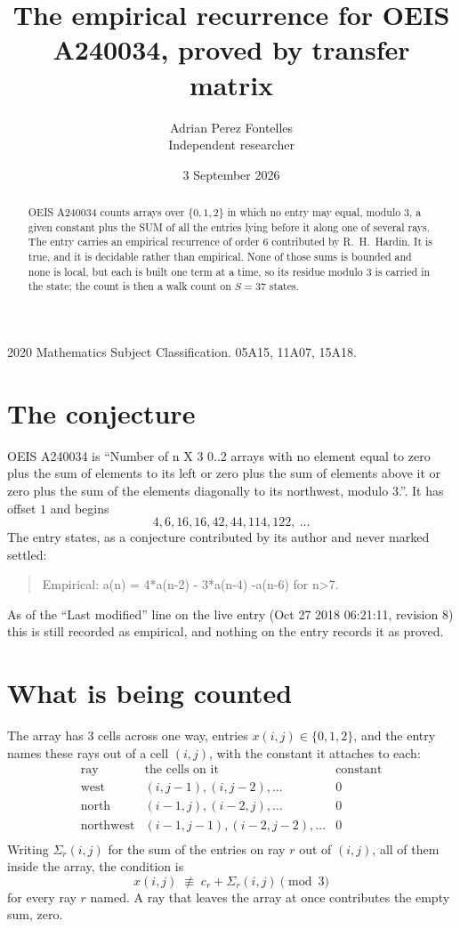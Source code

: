 \documentclass[11pt,a4paper]{article}
\title{The empirical recurrence for OEIS A240034, proved by transfer matrix}
\author{Adrian Perez Fontelles\\ \small Independent researcher}
\date{3 September 2026}
\theoremstyle{plain}
\theoremstyle{definition}
\begin{document}
\maketitle

\begin{abstract}
OEIS A240034 counts arrays over $\{0,1,2\}$ in which no entry may equal, modulo $3$, a given
constant plus the SUM of all the entries lying before it along one of several rays. The entry
carries an empirical recurrence of order $6$ contributed by R.~H.~Hardin. It is true, and
it is decidable rather than empirical. None of those sums is bounded and none is local, but
each is built one term at a time, so its residue modulo $3$ is carried in the state; the
count is then a walk count on $S=37$ states.
\end{abstract}

\noindent\small 2020 Mathematics Subject Classification. 05A15, 11A07, 15A18.\normalsize

\section{The conjecture}

OEIS A240034 is ``Number of n X 3 0..2 arrays with no element equal to zero plus the sum of elements to its left or zero plus the sum of elements above it or zero plus the sum of the elements diagonally to its northwest, modulo 3.''. It has offset $1$ and begins
\[
4, 6, 16, 16, 42, 44, 114, 122,\ \dots
\]
The entry states, as a conjecture contributed by its author and never marked settled:
\begin{quote}
Empirical: a(n) = 4*a(n-2) - 3*a(n-4)  -a(n-6) for n>7.
\end{quote}
As of the ``Last modified'' line on the live entry (Oct 27 2018 06:21:11, revision 8) this is still
recorded as empirical, and nothing on the entry records it as proved.

\section{What is being counted}

The array has $3$ cells across one way, entries $x(i,j)\in\{0,1,2\}$, and the entry names these
rays out of a cell $(i,j)$, with the constant it attaches to each:
\[
\begin{array}{lll}
\text{ray} & \text{the cells on it} & \text{constant} \\[2pt]
\text{west} & (i,j-1),(i,j-2),\dots & 0 \\
\text{north} & (i-1,j),(i-2,j),\dots & 0 \\
\text{northwest} & (i-1,j-1),(i-2,j-2),\dots & 0 \\
\end{array}
\]
Writing $\Sigma_r(i,j)$ for the sum of the entries on ray $r$ out of $(i,j)$, all of them
inside the array, the condition is
\[
x(i,j)\;\not\equiv\;c_r+\Sigma_r(i,j) \pmod{3}
\]
for every ray $r$ named. A ray that leaves the array at once contributes the empty sum,
zero.
\end{document}
